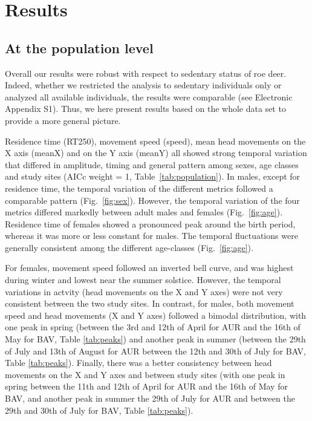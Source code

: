 \documentclass[a4paper,11pt]{article}
\begin{document}
\section*{Results}
\subsection*{At the population level}

Overall our results were robust with respect to sedentary status of
roe deer. Indeed, whether we restricted the analysis to sedentary
individuals only or analyzed all available individuals, the results
were comparable (see Electronic Appendix S1). Thus, we here present
results based on the whole data set to provide a more general picture.

Residence time (RT250), movement speed (speed), mean head movements on
the X axis (meanX) and on the Y axis (meanY) all showed strong
temporal variation that differed in amplitude, timing and general
pattern among sexes, age classes and study sites (AICc weight = 1,
Table~\ref{tab:population}). In males, except for residence time, the
temporal variation of the different metrics followed a comparable
pattern (Fig.~\ref{fig:sex}). However, the temporal variation of the
four metrics differed markedly between adult males and females
(Fig.~\ref{fig:age}). Residence time of females showed a pronounced
peak around the birth period, whereas it was more or less constant for
males. The temporal fluctuations were generally consistent among the
different age-classes (Fig.~\ref{fig:age}).

For females, movement speed followed an inverted bell curve, and was
highest during winter and lowest near the summer solstice. However,
the temporal variations in actvity (head movements on the X and Y
axes) were not very consistent between the two study sites. In
contrast, for males, both movement speed and head movements (X and Y
axes) followed a bimodal distribution, with one peak in spring
(between the 3rd and 12th of April for AUR and the 16th of May for
BAV, Table \ref{tab:peaks}) and another peak in summer (between the
29th of July and 13th of August for AUR between the 12th and 30th of
July for BAV, Table \ref{tab:peaks}). Finally, there was a better
consistency between head movements on the X and Y axes and between
study sites (with one peak in spring between the 11th and 12th of
April for AUR and the 16th of May for BAV, and another peak in summer
the 29th of July for AUR and between the 29th and 30th of July for
BAV, Table \ref{tab:peaks}).
\end{document}
